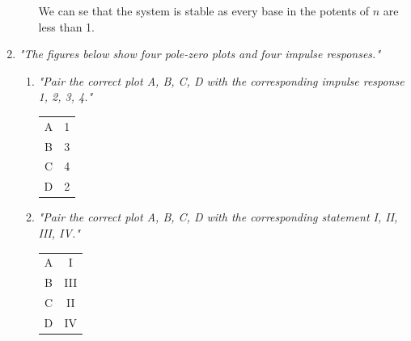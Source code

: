 \documentclass{article}
\begin{document}
\begin{enumerate}
\begin{enumerate}
                We can se that the system is stable as every base in the
                potents of $n$ are less than 1.
        \end{enumerate}
    \item %
        \emph{"The figures below show four pole-zero plots and four impulse responses."}
        \begin{enumerate}
            \item %
                \emph{"Pair the correct plot A, B, C, D with the corresponding impulse response 1, 2, 3, 4."}
                \\
                \begin{center}
                    \begin{tabular}{c|c}
                        A & 1 \\
                        B & 3 \\
                        C & 4 \\
                        D & 2 \\
                    \end{tabular}
                \end{center}
            \item %
                \emph{"Pair the correct plot A, B, C, D with the corresponding statement I, II, III, IV."}
                \\
                \begin{center}
                    \begin{tabular}{c|c}
                        A & I \\
                        B & III \\
                        C & II \\
                        D & IV \\
                    \end{tabular}
                \end{center}
                
                
        \end{enumerate} %
        
	\end{enumerate} %
\end{document}
